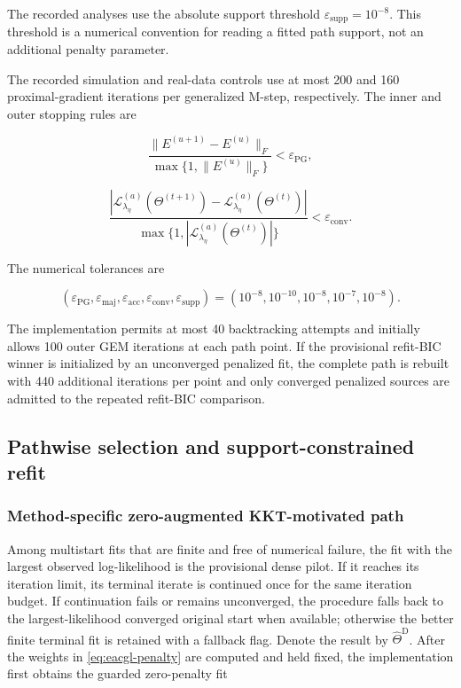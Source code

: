 \documentclass[preprint,12pt,authoryear]{elsarticle}
\begin{document}
The recorded analyses use the absolute support threshold
$\varepsilon_{\mathrm{supp}}=10^{-8}$. This threshold is a numerical convention
for reading a fitted path support, not an additional penalty parameter.

The recorded simulation and real-data controls use at most 200 and 160
proximal-gradient iterations per generalized M-step, respectively. The inner
and outer stopping rules are

\begin{equation}
\label{eq:pg-stopping}
\frac{\lVert E^{(u+1)}-E^{(u)}\rVert_F}
{\max\{1,\lVert E^{(u)}\rVert_F\}}
<\varepsilon_{\mathrm{PG}},
\end{equation}

\begin{equation}
\label{eq:gem-stopping}
\frac{|\mathcal L_{\lambda_\eta}^{(a)}(\Theta^{(t+1)})
-\mathcal L_{\lambda_\eta}^{(a)}(\Theta^{(t)})|}
{\max\{1,|\mathcal L_{\lambda_\eta}^{(a)}(\Theta^{(t)})|\}}
<\varepsilon_{\mathrm{conv}}.
\end{equation}

The numerical tolerances are

\[
(\varepsilon_{\mathrm{PG}},\varepsilon_{\mathrm{maj}},
\varepsilon_{\mathrm{acc}},\varepsilon_{\mathrm{conv}},
\varepsilon_{\mathrm{supp}})
=(10^{-8},10^{-10},10^{-8},10^{-7},10^{-8}).
\]

The implementation permits at most 40 backtracking attempts and initially
allows 100 outer GEM iterations at each path point. If the provisional
refit-BIC winner is initialized by an unconverged penalized fit, the complete
path is rebuilt with 440 additional iterations per point and only converged
penalized sources are admitted to the repeated refit-BIC comparison.

\subsection{Pathwise selection and support-constrained refit}

\subsubsection{Method-specific zero-augmented KKT-motivated path}

Among multistart fits that are finite and free of numerical failure, the fit
with the largest observed log-likelihood is the provisional dense pilot. If it
reaches its iteration limit, its terminal
iterate is continued once for the same iteration budget. If continuation fails
or remains unconverged, the procedure falls back to the largest-likelihood
converged original start when available; otherwise the better finite terminal
fit is retained with a fallback flag. Denote the result by
$\widehat\Theta^{\mathrm D}$. After the weights in
\eqref{eq:eacgl-penalty} are computed and held fixed, the implementation first
obtains the guarded zero-penalty fit
\end{document}
